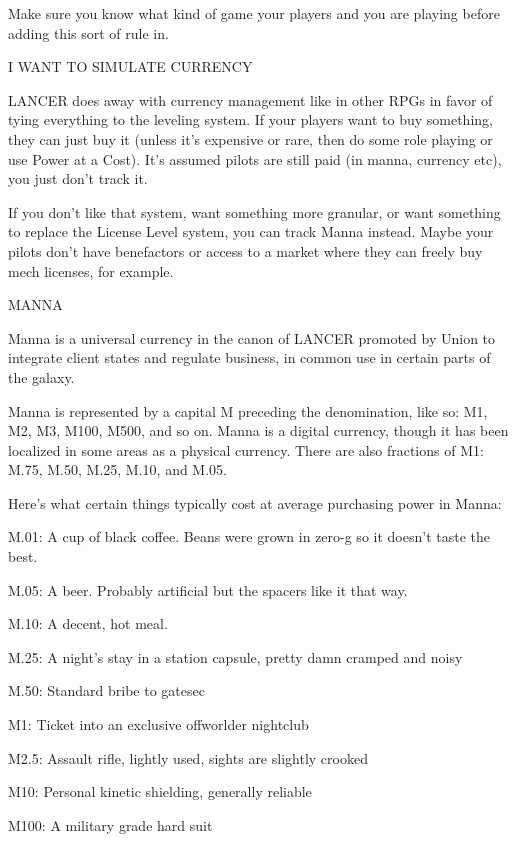 Make sure you know what kind of game your players and you are playing before adding this sort
of rule in.


                                    I WANT TO SIMULATE CURRENCY

LANCER does away with currency management like in other RPGs in favor of tying everything to
the leveling system. If your players want to buy something, they can just buy it (unless it's
expensive or rare, then do some role playing or use Power at a Cost). It's assumed pilots are
still paid (in manna, currency etc), you just don't track it.

If you don't like that system, want something more granular, or want something to replace the
License Level system, you can track Manna instead. Maybe your pilots don't have benefactors or
access to a market where they can freely buy mech licenses, for example.


                                                     MANNA

Manna is a universal currency in the canon of LANCER promoted by Union to integrate client
states and regulate business, in common use in certain parts of the galaxy.


Manna is represented by a capital M preceding the denomination, like so: M1, M2, M3, M100,
M500, and so on. Manna is a digital currency, though it has been localized in some areas as a
physical currency. There are also fractions of M1: M.75, M.50, M.25, M.10, and M.05.


Here's what certain things typically cost at average purchasing power in Manna:





M.01: A cup of black coffee. Beans were grown in zero-g so it doesn't taste the best.

M.05: A beer. Probably artificial but the spacers like it that way.

M.10: A decent, hot meal.

M.25: A night's stay in a station capsule, pretty damn cramped and noisy

M.50: Standard bribe to gatesec

M1: Ticket into an exclusive offworlder nightclub

M2.5: Assault rifle, lightly used, sights are slightly crooked

M10: Personal kinetic shielding, generally reliable

M100: A military grade hard suit

